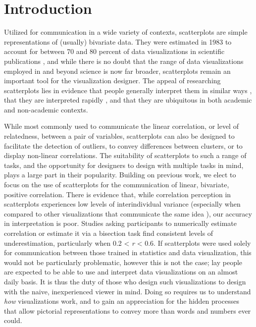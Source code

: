 \documentclass[manuscript,screen,review,anonymous]{acmart}
\begin{document}
\setlength{\parskip}{-0.1pt}

\section{Introduction}\label{sec-intro}

Utilized for communication in a wide variety of contexts, scatterplots
are simple representations of (usually) bivariate data. They were
estimated in 1983 to account for between 70 and 80 percent of data
visualizations in scientific publications \citep{tufte_1983}, and while
there is no doubt that the range of data visualizations employed in and
beyond science is now far broader, scatterplots remain an important tool
for the visualization designer. The appeal of researching scatterplots
lies in evidence that people generally interpret them in similar ways
\citep{kay_2015}, that they are interpreted rapidly
\citep{rensink_2014}, and that they are ubiquitous in both academic
\citep{tufte_1983} and non-academic contexts.

While most commonly used to communicate the linear correlation, or level
of relatedness, between a pair of variables, scatterplots can also be
designed to facilitate the detection of outliers, to convey differences
between clusters, or to display non-linear correlations. The suitability
of scatterplots to such a range of tasks, and the opportunity for
designers to design with multiple tasks in mind, plays a large part in
their popularity. Building on previous work, we elect to focus on the
use of scatterplots for the communication of linear, bivariate, positive
correlation. There is evidence that, while correlation perception in
scatterplots experiences low levels of interindividual variance
(especially when compared to other visualizations that communicate the
same idea \citep{harrison_2014, kay_2015}), our accuracy in
interpretation is poor. Studies asking participants to numerically
estimate correlation
\citep{strahan_1978, bobko_1979, cleveland_1982, lane_1985, lauer_1989, collyer_1990, meyer_1992}
or estimate it via a bisection task \citep{rensink_2017} find consistent
levels of underestimation, particularly when 0.2 \textless{} \emph{r}
\textless{} 0.6. If scatterplots were used solely for communication
between those trained in statistics and data visualization, this would
not be particularly problematic, however this is not the case; lay
people are expected to be able to use and interpret data visualizations
on an almost daily basis. It is thus the duty of those who design such
visualizations to design with the naive, inexperienced viewer in mind.
Doing so requires us to understand \emph{how} visualizations work, and
to gain an appreciation for the hidden processes that allow pictorial
representations to convey more than words and numbers ever could.
\end{document}

